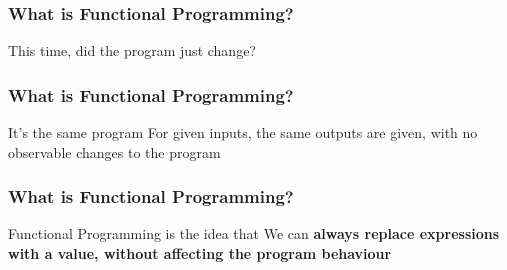 \begin{frame}
\frametitle{What is Functional Programming?}
\begin{center}
This time, did the program just change?
\end{center}
\end{frame}

\begin{frame}
\frametitle{What is Functional Programming?}
\begin{block}{It's the same program}
For given inputs, the same outputs are given, with no observable changes to the program
\end{block}
\end{frame}

\begin{frame}
\frametitle{What is Functional Programming?}
\begin{block}{Functional Programming is the idea that}
We can \textbf{always replace expressions with a value, without affecting the program behaviour}
\end{block}
\begin{center}
\end{center}
\end{frame}
